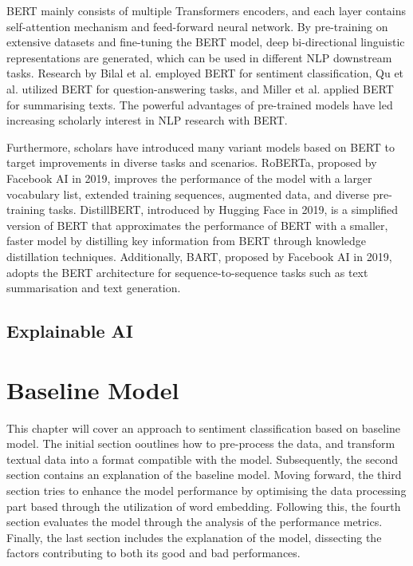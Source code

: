 \documentclass[ %
                    author={Louis Wang},
                supervisor={Dr. Qiang Liu},
                    degree={MSc},
                     title={Identification of Suicide Ideation in Texts},
                      type={},
                      year={2024}]{dissertation}
\begin{document}
BERT mainly consists of multiple Transformers encoders, and each layer contains self-attention mechanism and feed-forward neural network.\cite{vaswani2017attention} By pre-training on extensive datasets and fine-tuning the BERT model, deep bi-directional linguistic representations are generated, which can be used in different NLP downstream tasks. Research by Bilal et al. employed BERT for sentiment classification\cite{bilal2023effectiveness}, Qu et al. utilized BERT for question-answering tasks\cite{qu2019bert}, and Miller et al. applied BERT for summarising texts\cite{miller2019leveraging}. The powerful advantages of pre-trained models have led increasing scholarly interest in NLP research with BERT.

Furthermore, scholars have introduced many variant models based on BERT to target improvements in diverse tasks and scenarios. RoBERTa, proposed by Facebook AI in 2019\cite{liu2019roberta}, improves the performance of the model with a larger vocabulary list, extended training sequences, augmented data, and diverse pre-training tasks. DistillBERT, introduced by Hugging Face in 2019\cite{sanh2020distilbert}, is a simplified version of BERT that approximates the performance of BERT with a smaller, faster model by distilling key information from BERT through knowledge distillation techniques. Additionally, BART, proposed by Facebook AI in 2019\cite{lewis2019bart}, adopts the BERT architecture for sequence-to-sequence tasks such as text summarisation and text generation.

\section{Explainable AI}


\chapter{Baseline Model}
\label{chap:execution1}

\noindent
This chapter will cover an approach to sentiment classification based on baseline model. The initial section ooutlines how to pre-process the data, and transform textual data into a format compatible with the model. Subsequently, the second section contains an explanation of the baseline model. Moving forward, the third section tries to enhance the model performance by optimising the data processing part based through the utilization of word embedding. Following this, the fourth section evaluates the model through the analysis of the performance metrics. Finally, the last section includes the explanation of the model, dissecting the factors contributing to both its good and bad performances.
\end{document}
